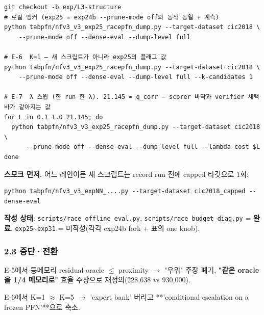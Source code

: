 \begin{Verbatim}[breaklines=true,breakanywhere=true,fontsize=\scriptsize]
git checkout -b exp/L3-structure
# 로컬 앵커 (exp25 = exp24b --prune-mode off와 동작 동일 + 계측)
python tabpfn/nfv3_v3_exp25_racepfn_dump.py --target-dataset cic2018 \
    --prune-mode off --dense-eval --dump-level full

# E-6  K=1 — 새 스크립트가 아니라 exp25의 플래그 값
python tabpfn/nfv3_v3_exp25_racepfn_dump.py --target-dataset cic2018 \
    --prune-mode off --dense-eval --dump-level full --k-candidates 1

# E-7  λ 스윕 (한 run 한 λ). 21.145 = q_corr — scorer 바닥과 verifier 채택 바가 같아지는 값
for L in 0.1 1.0 21.145; do
  python tabpfn/nfv3_v3_exp25_racepfn_dump.py --target-dataset cic2018 \
      --prune-mode off --dense-eval --dump-level full --lambda-cost $L
done

\end{Verbatim}
\textbf{스모크 먼저.} 어느 레인이든 새 스크립트는 record run 전에 capped 타깃으로 1회:


\begin{Verbatim}[breaklines=true,breakanywhere=true,fontsize=\scriptsize]
python tabpfn/nfv3_v3_expNN_....py --target-dataset cic2018_capped --dense-eval

\end{Verbatim}
\textbf{작성 상태}: \texttt{scripts/\allowbreak{}\allowbreak{}race\_\allowbreak{}\allowbreak{}off\allowbreak{}line\_\allowbreak{}\allowbreak{}eva\allowbreak{}l.\allowbreak{}py}, \texttt{scripts/\allowbreak{}\allowbreak{}race\_\allowbreak{}\allowbreak{}bud\allowbreak{}get\_\allowbreak{}\allowbreak{}diag\allowbreak{}.\allowbreak{}py} =\allowbreak{} \textbf{완료}. \texttt{exp25}\textasciitilde{}\texttt{exp31} =\allowbreak{} 미작성(각각 exp24b fork +\allowbreak{} 표의 one knob).

\subsubsection{2.3 중단·전환}
\par\noindent \textbullet\enspace E-5에서 등메모리 residual oracle \ensuremath{\leq} proximity  \ensuremath{\rightarrow}  "우위" 주장 폐기, \textbf{"같은 oracle을 1/\allowbreak{}4 메모리로"} 효율 주장으로 재정의(228,638 vs 930,000).


\par\noindent \textbullet\enspace E-6에서 K=\allowbreak{}1 \ensuremath{\approx} K=\allowbreak{}5  \ensuremath{\rightarrow}  'expert bank' 버리고 **'conditional escalation on a frozen PFN'**으로 축소.


